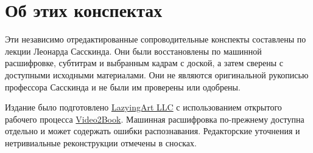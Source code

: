 \documentclass[11pt,oneside]{book}
\begin{document}
\frontmatter
\hypersetup{pageanchor=false}

\hypersetup{pageanchor=true}

\clearpage
\chapter*{Об этих конспектах}
Эти независимо отредактированные сопроводительные конспекты составлены по лекции Леонарда
Сасскинда. Они были восстановлены по машинной расшифровке, субтитрам
и выбранным кадрам с доской, а затем сверены с доступными исходными
материалами. Они не являются оригинальной рукописью профессора Сасскинда и
не были им проверены или одобрены.

Издание было подготовлено \href{https://lazying.art}{LazyingArt LLC}
с использованием открытого
рабочего процесса \href{https://github.com/lachlanchen/Video2Book}{Video2Book}.
Машинная расшифровка по-прежнему доступна отдельно и может содержать
ошибки распознавания. Редакторские уточнения и нетривиальные
реконструкции отмечены в сносках.
\clearpage
\tableofcontents
\mainmatter
\graphicspath{{../../../generated_course_notes/supplementary/higgs_boson/2012_summer/chapters/lecture_01/}{../../../generated_course_notes/supplementary/higgs_boson/2012_summer/figures/}{../../../generated_course_notes/supplementary/higgs_boson/2012_summer/assets/}}

\end{document}

